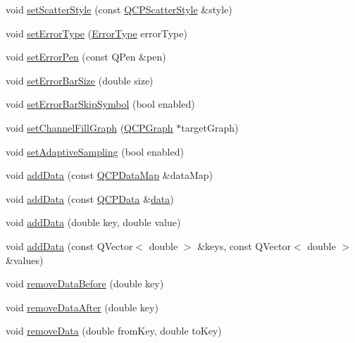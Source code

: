 \begin{DoxyCompactItemize}
\item 
void \hyperlink{class_q_c_p_graph_a12bd17a8ba21983163ec5d8f42a9fea5}{set\+Scatter\+Style} (const \hyperlink{class_q_c_p_scatter_style}{Q\+C\+P\+Scatter\+Style} \&style)
\item 
void \hyperlink{class_q_c_p_graph_ac3614d799c3894f2bc646e99c7f73d38}{set\+Error\+Type} (\hyperlink{class_q_c_p_graph_ad23b514404bd2cb3216f57c90904d6af}{Error\+Type} error\+Type)
\item 
void \hyperlink{class_q_c_p_graph_abd4c7f81939e10776ea64603a704f22a}{set\+Error\+Pen} (const Q\+Pen \&pen)
\item 
void \hyperlink{class_q_c_p_graph_a10f50c5495ce45ef559ec2066194a335}{set\+Error\+Bar\+Size} (double size)
\item 
void \hyperlink{class_q_c_p_graph_ab1c1ee03d8dd94676a564e5e5f11aac2}{set\+Error\+Bar\+Skip\+Symbol} (bool enabled)
\item 
void \hyperlink{class_q_c_p_graph_a2d03156df1b64037a2e36cfa50351ca3}{set\+Channel\+Fill\+Graph} (\hyperlink{class_q_c_p_graph}{Q\+C\+P\+Graph} $\ast$target\+Graph)
\item 
void \hyperlink{class_q_c_p_graph_ab468cd600160f327836aa0644291e64c}{set\+Adaptive\+Sampling} (bool enabled)
\item 
void \hyperlink{class_q_c_p_graph_aa5c6181d84db72ce4dbe9dc15a34ef4f}{add\+Data} (const \hyperlink{qcustomplot_8h_a84a9c4a4c2216ccfdcb5f3067cda76e3}{Q\+C\+P\+Data\+Map} \&data\+Map)
\item 
void \hyperlink{class_q_c_p_graph_a80cc91e1e0ef77eb50afc5b366d0efd9}{add\+Data} (const \hyperlink{class_q_c_p_data}{Q\+C\+P\+Data} \&\hyperlink{class_q_c_p_graph_acde1c0d1f6a817930489548396e6b3e6}{data})
\item 
void \hyperlink{class_q_c_p_graph_a0bf98b1972286cfb7b1c4b7dd6ae2012}{add\+Data} (double key, double value)
\item 
void \hyperlink{class_q_c_p_graph_ab6da6377541fe80d892a9893a92db9c6}{add\+Data} (const Q\+Vector$<$ double $>$ \&keys, const Q\+Vector$<$ double $>$ \&values)
\item 
void \hyperlink{class_q_c_p_graph_a9fe0b3e54e8c7b61319bd03337e21e99}{remove\+Data\+Before} (double key)
\item 
void \hyperlink{class_q_c_p_graph_ae42d645ef617cfc75fc0df58e62c522a}{remove\+Data\+After} (double key)
\item 
void \hyperlink{class_q_c_p_graph_a4a0fde50b7db9db0a85b5c5b6b10098f}{remove\+Data} (double from\+Key, double to\+Key)
\item 

\end{DoxyCompactItemize}
